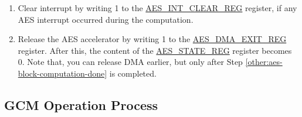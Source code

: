 \documentclass[main\_\_EN.tex]{subfiles}
\begin{document}
\begin{enumerate}
    \item Clear interrupt by writing 1 to the \hyperref[regdesc:AESINTCLEARREG]{AES\_INT\_CLEAR\_REG} register, if any AES interrupt occurred during the computation.
    \item Release the AES accelerator by writing 1 to the \hyperref[regdesc:AESDMAEXITREG]{AES\_DMA\_EXIT\_REG} register. After this, the content of the \hyperref[regdesc:AESSTATEREG]{AES\_STATE\_REG} register becomes 0.
    Note that, you can release DMA earlier, but only after Step \ref{other:aes-block-computation-done} is completed.
\end{enumerate}

\subsection{GCM Operation Process}
\end{document}

